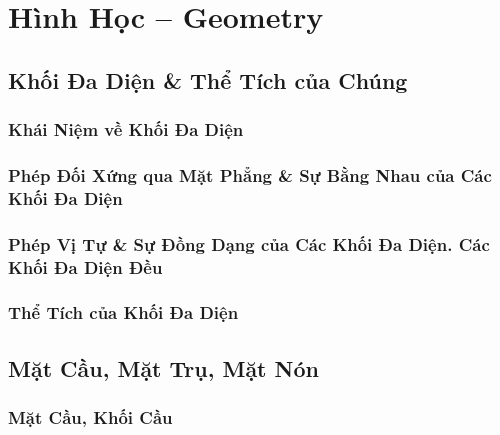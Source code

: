 \documentclass[oneside]{book}
\numberwithin{equation}{section}
\begin{document}

\part{Hình Học -- Geometry}

\chapter{Khối Đa Diện \& Thể Tích của Chúng}

\section{Khái Niệm về Khối Đa Diện}


\section{Phép Đối Xứng qua Mặt Phẳng \& Sự Bằng Nhau của Các Khối Đa Diện}


\section{Phép Vị Tự \& Sự Đồng Dạng của Các Khối Đa Diện. Các Khối Đa Diện Đều}


\section{Thể Tích của Khối Đa Diện}


\chapter{Mặt Cầu, Mặt Trụ, Mặt Nón}

\section{Mặt Cầu, Khối Cầu}

\end{document}
